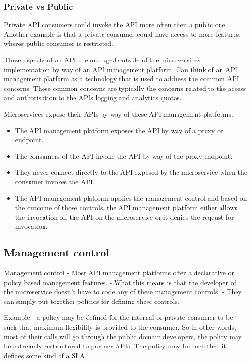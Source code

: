 \documentclass[a4paper, 11pt]{book}
\begin{document}
    \subsubsection{Private vs Public.}
    Private API consumers could invoke the API more often then a public one.
    Another example is that a private consumer could have access to more features, wheres public consumer is restricted.

    These aspects of an API are managed outside of the microservices implementation by way of an API management platform.
    Can think of an API management platform as a technology that is used to address the common API concerns.
    These common concerns are typically the concerns related to the access and authorisation to the APIs logging and analytics quotas.

    Microservices expose their APIs by way of these API management platforms.
    \begin{itemize}
        \item The API management platform exposes the API by way of a proxy or endpoint.
        \item The consumers of the API invoke the API by way of the proxy endpoint.
        \item They never connect directly to the API exposed by the microservice when the consumer invokes the API.
        \item The API management platform applies the management control and based on the outcome of those controls, the API management platform either allows the invocation oif the API on the microservice or it denies the reqeust for invocation.
    \end{itemize}

    \subsection{    Management control}
    Management control
    - Most API management platforms offer a declarative or policy based management features.
    - What this means is that the developer of the microservice doesn't have to code any of these management controls.
    - They can simply put together policies for defining these controls.

    Example - a policy may be defined for the internal or private consumer to be such that maximum flexibility is provided to the consumer.
    So in other words, most of their calls will go through the public domain developers, the policy may be extremely restructured to partner APIs.
    The policy may be such that it defines some kind of a SLA.
\end{document}
